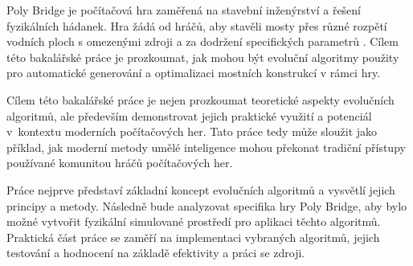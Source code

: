 Poly Bridge je počítačová hra zaměřená na stavební inženýrství a řešení fyzikálních hádanek. Hra žádá od hráčů, aby stavěli mosty přes různé rozpětí vodních ploch s omezenými zdroji a za dodržení specifických parametrů \cite{drycactus}. Cílem této bakalářské práce je prozkoumat, jak mohou být evoluční algoritmy použity pro automatické generování a optimalizaci mostních konstrukcí v rámci hry.

Cílem této bakalářské práce je nejen prozkoumat teoretické aspekty evolučních algoritmů, ale především demonstrovat jejich praktické využití a potenciál v~kontextu moderních počítačových her. Tato práce tedy může sloužit jako příklad, jak moderní metody umělé inteligence mohou překonat tradiční přístupy používané komunitou hráčů počítačových her. 

Práce nejprve představí základní koncept evolučních algoritmů a vysvětlí jejich principy a metody. Následně bude analyzovat specifika hry Poly Bridge, aby bylo možné vytvořit fyzikální simulované prostředí pro aplikaci těchto algoritmů. Praktická část práce se zaměří na implementaci vybraných algoritmů, jejich testování a hodnocení na základě efektivity a práci se zdroji.




